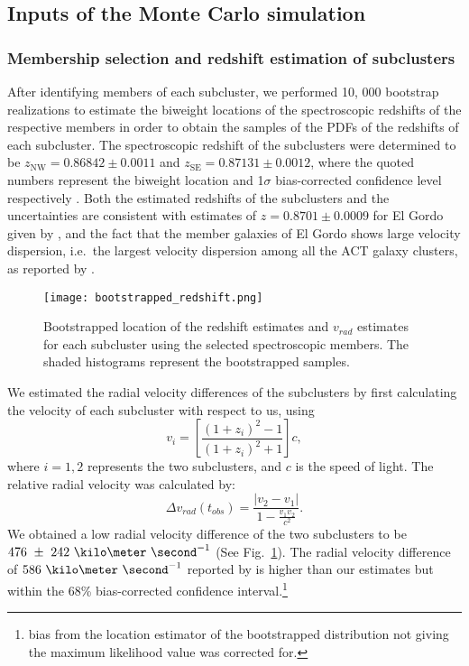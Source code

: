 \documentclass[ucdthesis.tex]{subfiles}
\begin{document}
    \subsection{Inputs of the Monte Carlo simulation} \label{sec:inputs}
    \subsubsection{Membership selection and redshift estimation of subclusters}
    \label{subsubsec:membership_and_redshift}
    After identifying members of each subcluster, 
    we performed 10, 000 bootstrap realizations to estimate the biweight
    locations of the spectroscopic redshifts of the respective members in order
    to obtain the samples of the PDFs of the redshifts of each subcluster. 
    The spectroscopic redshift of the subclusters were
    determined to be 
    $z_{\mathrm{NW}} = 0.86842 \pm 0.0011$ and 
    $z_{\mathrm{SE}} = 0.87131 \pm 0.0012$, where the quoted numbers represent the
    biweight location and 1$\sigma$ bias-corrected confidence level
    respectively \citep{Beers90}.  
    Both the estimated redshifts of the subclusters and the uncertainties are
    consistent with estimates of $z=0.8701 \pm 0.0009$ for El Gordo given by 
    \citealt{Sifon13}, and the fact that the
    member galaxies of El
    Gordo shows large velocity dispersion, i.e.\ the largest velocity
    dispersion among all the ACT galaxy clusters, as reported by
    .
    \begin{figure}
    	\texttt{[image: bootstrapped\_redshift.png]}
    	\caption{Bootstrapped location of the
    	redshift estimates and $v_{rad}$ estimates for each subcluster using the
    	selected spectroscopic members. The shaded histograms represent the
    	bootstrapped samples.
    } \label{fig:bootstrap_redshift}
    \end{figure}
    We estimated the radial velocity differences of the
    subclusters by first calculating the velocity of each subcluster with
    respect to us, using  
    \begin{equation}
    	v_i = \left[ \frac{(1+z_i)^2 - 1 }{(1+z_i)^2 + 1 }\right]c,
    \end{equation}
    where $i=1, 2$ represents the two subclusters, and $c$ is the speed of
    light. The relative radial velocity was calculated by: 
    \begin{equation}
    	\Delta v_{rad}(t_{obs}) = \frac{|v_2 - v_1|}{1-\frac{v_1 v_2}{c^2}}.
    \end{equation}
    We obtained a low radial velocity difference of the two subclusters to be
    $476~\pm~242~\kilo\meter~\second^{-1}$ (See Fig.~\ref{fig:bootstrap_redshift}). 
    The radial velocity difference of $586~\kilo \meter~\second^{-1}$ reported by  
    is higher than our estimates but within the 68\% bias-corrected
    confidence interval.\footnote{bias from the location estimator of
    	the bootstrapped distribution not giving the maximum likelihood value was
    corrected for.} 
\end{document}
